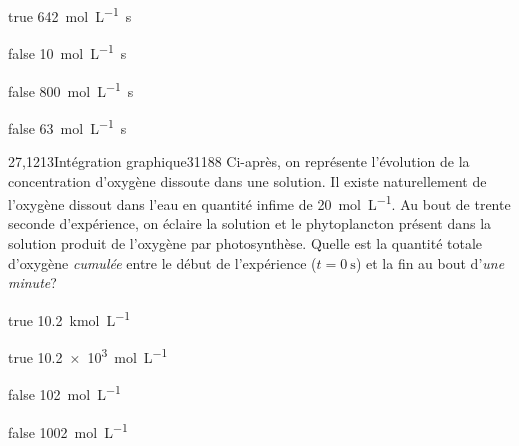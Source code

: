         \begin{reponses}
		    \item[true] \SI{642}{\mol\per\liter.\second}
		    \item[false] \SI{10}{\mol\per\liter.\second}
		    \item[false] \SI{800}{\mol\per\liter.\second}
		    \item[false] \SI{63}{\mol\per\liter.\second}
	    \end{reponses}
		\begin{question}{27,1213}{Intégration graphique}{3}{1188}
             Ci-après, on représente l'évolution de la concentration d'oxygène dissoute dans une solution. Il existe naturellement de l'oxygène dissout dans l'eau en quantité infime de \SI{20}{\mol\per\liter}. Au bout de trente seconde d'expérience, on éclaire la solution et le phytoplancton présent dans la solution produit de l'oxygène par photosynthèse. Quelle est la quantité totale d'oxygène \emph{cumulée} entre le début de l'expérience ($t=\SI{0}{\second}$) et la fin au bout d'\emph{une minute}?
            \begin{figure}
             \end{figure}
        \end{question}
        \begin{reponses}
            \item[true] \SI{10.2}{\kilo\mol\per\liter}
		    \item[true] \SI{10.2e3}{\mol\per\liter}
		    \item[false] \SI{102}{\mol\per\liter}
		    \item[false] \SI{1002}{\mol\per\liter}
		    \end{reponses}
